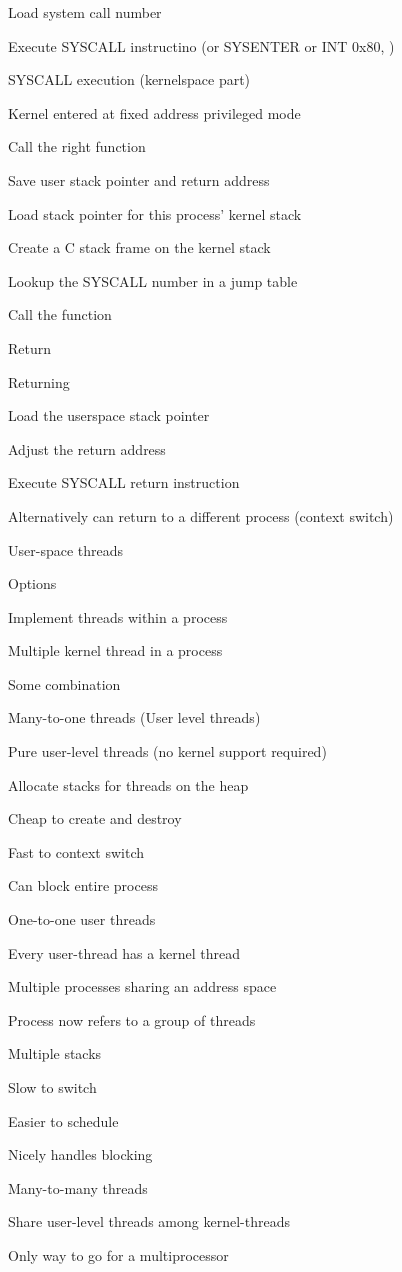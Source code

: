 			\item Load system call number
			\item Execute SYSCALL instructino (or SYSENTER or INT 0x80, \ddd)
		\enumend
		\item SYSCALL execution (kernelspace part)
		\enumstart
			\item Kernel entered at fixed address \arrow privileged mode
			\item Call the right function
			\enumstart
				\item Save user stack pointer and return address
				\item Load stack pointer for this process' kernel stack
				\item Create a C stack frame on the kernel stack
				\item Lookup the SYSCALL number in a jump table
				\item Call the function
			\enumend
			\item Return
		\enumend
		\item Returning
		\enumstart
			\item Load the userspace stack pointer
			\item Adjust the return address
			\item Execute SYSCALL return instruction
			\item Alternatively can return to a different process (context switch)
		\enumend
	\enumend
	\item User-space threads
	\enumstart
		\item Options
		\enumstart
			\item Implement threads within a process
			\item Multiple kernel thread in a process
			\item Some combination
		\enumend
		\item Many-to-one threads (User level threads)
		\enumstart
			\item Pure user-level threads (no kernel support required)
			\item Allocate stacks for threads on the heap
			\item Cheap to create and destroy
			\item Fast to context switch
			\item Can block entire process
		\enumend
		\item One-to-one user threads
		\enumstart
			\item Every user-thread has a kernel thread
			\item Multiple processes sharing an address space
			\item Process now refers to a group of threads
			\item Multiple stacks
			\item Slow to switch
			\item Easier to schedule
			\item Nicely handles blocking
		\enumend
		\item Many-to-many threads
		\enumstart
			\item Share user-level threads among kernel-threads
			\item Only way to go for a multiprocessor
		\enumend
	\enumend
\enumend